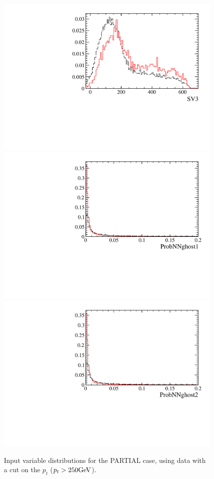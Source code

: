 \documentclass[12pt,a4paper]{article}
\begin{document}
\begin{figure} [htb!]
\begin{center}
\includegraphics[scale=0.20]{figs/SV3PARTIALptcut.pdf}
\includegraphics[scale=0.20]{figs/ProbNNghost1PARTIALptcut.pdf}
\includegraphics[scale=0.20]{figs/ProbNNghost2PARTIALptcut.pdf}
\caption{Input variable distributions for the PARTIAL case, using \Kspipi data with a cut on the $p_t$ ($p_t > 250 \rm GeV$).
\label{fig:MVAhistos_PARTIAL2pipi1}}
\end{center}
\end{figure}
\end{document}
